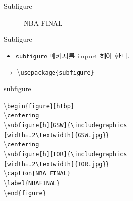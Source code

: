 \documentclass[12pt]{gshs_lecture}
\newenvironment{codeblock}[1]{
	\begin{block}{#1}
		\setstretch{1.0}
		\begin{small}
}{
		\end{small}
	\end{block}
}
\begin{document}
\begin{frame}[t]{Subfigure}
	
	\begin{figure}[h]
		\centering
		\centering
		\caption{NBA FINAL}
		\label{NBAFINAL}
	\end{figure}
	
\end{frame}

\begin{frame}[t]{Subfigure}
	
	\begin{itemize}
		\item \texttt{subfigure} 패키지를 import 해야 한다.
	\end{itemize}
	
	\hspace{6mm} $\rightarrow$ \textbackslash \texttt{usepackage\{subfigure\}}
	
	\begin{codeblock}{subfigure}
		\textbackslash \texttt{begin\{figure\}[htbp]}\\
		\hspace{6mm} \textbackslash \texttt{centering}\\
		\hspace{6mm} \textbackslash \texttt{subfigure[h][GSW]\{\textbackslash includegraphics\\
			\hspace{6mm} [width=.2\textbackslash textwidth]\{GSW.jpg\}\}}\\
		\hspace{6mm} \textbackslash \texttt{centering}\\
		\hspace{6mm} \textbackslash \texttt{subfigure[h][TOR]\{\textbackslash includegraphics\\
			\hspace{6mm} [width=.2\textbackslash textwidth]\{TOR.jpg\}\}}\\
		\hspace{6mm} \textbackslash \texttt{caption\{NBA FINAL\}}\\
		\hspace{6mm} \textbackslash \texttt{label\{NBAFINAL\}}\\
		\textbackslash \texttt{end\{figure\}}	
	\end{codeblock}
	
\end{frame}
\end{document}
